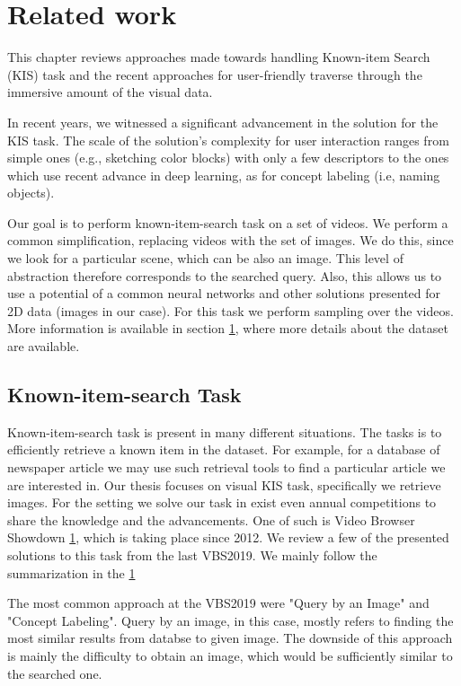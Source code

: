 \chapter{Related work}


This chapter reviews approaches made towards handling Known-item Search (KIS) task and the recent approaches for user-friendly traverse through the immersive amount of the visual data.

In recent years, we witnessed a significant advancement in the solution for the KIS task. The scale of the solution's complexity for user interaction ranges from simple ones (e.g., sketching color blocks) with only a few descriptors to the ones which use recent advance in deep learning, as for concept labeling (i.e, naming objects).

Our goal is to perform known-item-search task on a set of videos. We perform a common simplification, replacing videos with the set of images. We do this, since we look for a particular scene, which can be also an image. This level of abstraction therefore corresponds to the searched query. Also, this allows us to use a potential of a common neural networks and other solutions presented for 2D data (images in our case). For this task we perform sampling over the videos. More information is available in section \ref{}, where more details about the dataset are available.

\section*{Known-item-search Task}

Known-item-search task is present in many different situations. The tasks is to efficiently retrieve a known item in the dataset. For example, for a database of newspaper article we may use such retrieval tools to find a particular article we are interested in. Our thesis focuses on visual KIS task, specifically we retrieve images. For the setting we solve our task in exist even annual competitions to share the knowledge and the advancements. One of such is Video Browser Showdown \ref{}, which is taking place since 2012. We review a few of the presented solutions to this task from the last VBS2019. We mainly follow the summarization in the \ref{}

The most common approach at the VBS2019 were "Query by an Image" and "Concept Labeling". Query by an image, in this case, mostly refers to finding the most similar results from databse to given image. The downside of this approach is mainly the difficulty to obtain an image, which would be sufficiently similar to the searched one.

